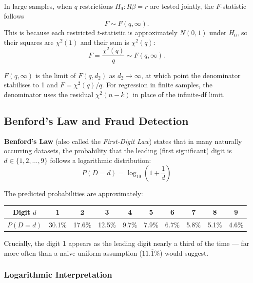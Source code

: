 \begin{theorem}
In large samples, when $q$ restrictions $H_0\colon R\beta = r$ are tested jointly, the $F$-statistic follows
\[
F \sim F(q, \infty).
\]
This is because each restricted $t$-statistic is approximately $N(0,1)$ under $H_0$, so their squares are $\chi^2(1)$ and their sum is $\chi^2(q)$:
\[
F = \frac{\chi^2(q)}{q} \sim F(q,\infty).
\]
\end{theorem}

\begin{remark}
$F(q,\infty)$ is the limit of $F(q, d_2)$ as $d_2 \to \infty$, at which point the denominator stabilises to 1 and $F = \chi^2(q)/q$. For regression in finite samples, the denominator uses the residual $\chi^2(n-k)$ in place of the infinite-df limit.
\end{remark}

\subsection{Benford's Law and Fraud Detection}

\begin{definition}
\textbf{Benford's Law} (also called the \textit{First-Digit Law}) states that in many naturally occurring datasets, the probability that the leading (first significant) digit is $d \in \{1, 2, \ldots, 9\}$ follows a logarithmic distribution:
\[
P(D = d) = \log_{10}\!\left(1 + \frac{1}{d}\right)
\]
\end{definition}

\begin{remark}
The predicted probabilities are approximately:
\begin{center}
\begin{tabular}{c|ccccccccc}
Digit $d$ & 1 & 2 & 3 & 4 & 5 & 6 & 7 & 8 & 9 \\
\hline
$P(D=d)$ & 30.1\% & 17.6\% & 12.5\% & 9.7\% & 7.9\% & 6.7\% & 5.8\% & 5.1\% & 4.6\%
\end{tabular}
\end{center}
Crucially, the digit \textbf{1} appears as the leading digit nearly a third of the time --- far more often than a naive uniform assumption ($11.\overline{1}\%$) would suggest.
\end{remark}

\subsubsection*{Logarithmic Interpretation}


